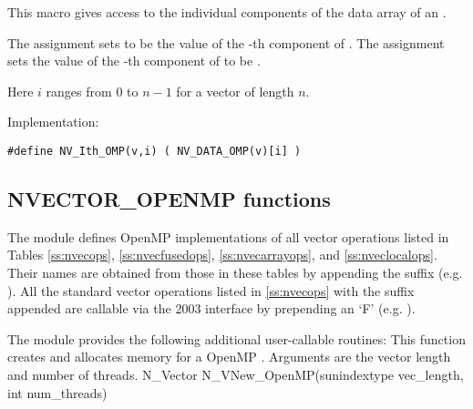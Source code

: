 \begin{itemize}
  This macro gives access to the individual components of the data
  array of an .

  The assignment  sets  to be the value of
  the -th component of . The assignment 
  sets the value of the -th component of  to be .

  Here $i$ ranges from $0$ to $n-1$ for a vector of length $n$.

  Implementation:

  \verb|#define NV_Ith_OMP(v,i) ( NV_DATA_OMP(v)[i] )|

\end{itemize}


\subsection{NVECTOR\_OPENMP functions}
\label{ss:nvec_openmp_functions}

The {\nvecopenmp} module defines OpenMP implementations of all vector operations listed
in Tables \ref{ss:nvecops}, \ref{ss:nvecfusedops}, \ref{ss:nvecarrayops},
and \ref{ss:nveclocalops}. Their names are obtained from those in these
tables by appending the suffix  (e.g. ).
All the standard vector operations listed in \ref{ss:nvecops} with the suffix
 appended are callable via the {\F} 2003 interface by prepending an
`F' (e.g. ).

The module {\nvecopenmp} provides the following additional user-callable routines:
{
 This function creates and allocates memory for a OpenMP .
 Arguments are the vector length and number of threads.
}
{
 N\_Vector N\_VNew\_OpenMP(sunindextype vec\_length, int num\_threads)
}


